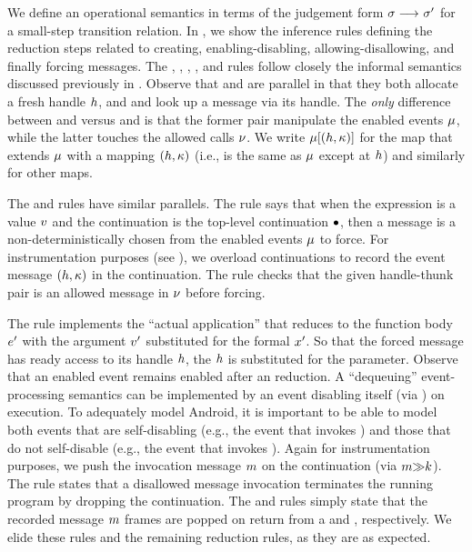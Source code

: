 \documentclass[10pt,reprint,nocopyrightspace,numbers]{sigplanconf}
\begin{document}
We define an operational semantics in terms of the judgement form $\sigma \longrightarrow_{} \sigma'$ for a small-step transition relation. In , we show the inference rules defining the reduction steps related to creating, enabling-disabling, allowing-disallowing, and finally forcing messages.
The , , , , and  rules follow closely the informal semantics discussed previously in . Observe that  and  are parallel in that they both allocate a fresh handle $h$, and  and  look up a message via its handle. The \emph{only} difference between  and  versus  and  is that the former pair manipulate the enabled events $\mu$, while the latter touches the allowed calls $\nu$.
We write $\mu[(h,\kappa)]$ for the map that extends $\mu$ with a mapping $(h,\kappa)$ (i.e., is the same as $\mu$ except at $h$) and similarly for other maps.

The  and  rules have similar parallels. The  rule says that when the expression is a value $v$ and the continuation is the top-level continuation $\bullet$, then a message is a non-deterministically chosen from the enabled events $\mu$ to force. For instrumentation purposes (see ), we overload continuations to record the event message $(h,\kappa)$ in the continuation.
The  rule checks that the given handle-thunk pair is an allowed message in $\nu$ before forcing.

The  rule implements the ``actual application'' that reduces to the function body $e'$ with the argument $v'$ substituted for the formal $x'$. So that the forced message has ready access to its handle $h$, the $h$ is substituted for the \enMe{} parameter. Observe that an enabled event remains enabled after an  reduction. A ``dequeuing'' event-processing semantics can be implemented by an event disabling itself (via \enDisable{\enMe}) on execution. To adequately model Android, it is important to be able to model both events that are self-disabling (e.g., the event that invokes ) and those that do not self-disable (e.g., the event that invokes ).
Again for instrumentation purposes, we push the invocation message $m$ on the continuation (via $m\mathord{\gg}k$).
The  rule states that a disallowed message invocation terminates the running program by dropping the continuation.
%
The  and  rules simply state that the recorded message $m$ frames are popped on return from a  and , respectively.
We elide these rules and the remaining reduction rules, as they are as expected.
\end{document}
